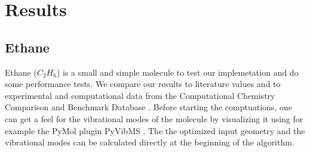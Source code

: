 \documentclass [12pt]{report}
\begin{document}
\chapter{Results}

\section{Ethane}
Ethane ($C_2H_6$) is a small and simple molecule to test our implemetation and do some performance tests. We compare our results to literature values\cite{c2h6} and to experimental and computational data from the Computational Chemistry Comparison and Benchmark Database \cite{cccbdb}. Before starting the comptuations, one can get a feel for the vibrational modes of the molecule by visualizing it using for example the PyMol plugin PyVibMS \cite{PyVibMS}. The the optimized input geometry and the vibrational modes can be calculated directly at the beginning of the algorithm. 
\end{document}
